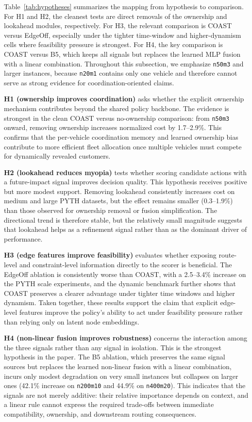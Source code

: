 \documentclass[letterpaper]{article}
\begin{document}
Table~\ref{tab:hypotheses} summarizes the mapping from hypothesis to comparison. For H1 and H2, the cleanest tests are direct removals of the ownership and lookahead modules, respectively. For H3, the relevant comparison is COAST versus EdgeOff, especially under the tighter time-window and higher-dynamism cells where feasibility pressure is strongest. For H4, the key comparison is COAST versus B5, which keeps all signals but replaces the learned MLP fusion with a linear combination. Throughout this subsection, we emphasize \texttt{n50m3} and larger instances, because \texttt{n20m1} contains only one vehicle and therefore cannot serve as strong evidence for coordination-oriented claims.

\textbf{H1 (ownership improves coordination)} asks whether the explicit ownership mechanism contributes beyond the shared policy backbone. The evidence is strongest in the clean COAST versus no-ownership comparison: from \texttt{n50m3} onward, removing ownership increases normalized cost by 1.7--2.9\%. This confirms that the per-vehicle coordination memory and learned ownership bias contribute to more efficient fleet allocation once multiple vehicles must compete for dynamically revealed customers.

\textbf{H2 (lookahead reduces myopia)} tests whether scoring candidate actions with a future-impact signal improves decision quality. This hypothesis receives positive but more modest support. Removing lookahead consistently increases cost on medium and large PYTH datasets, but the effect remains smaller (0.3--1.9\%) than those observed for ownership removal or fusion simplification. The directional trend is therefore stable, but the relatively small magnitude suggests that lookahead helps as a refinement signal rather than as the dominant driver of performance.

\textbf{H3 (edge features improve feasibility)} evaluates whether exposing route-level and constraint-level information directly to the scorer is beneficial. The EdgeOff ablation is consistently worse than COAST, with a 2.5--3.4\% increase on the PYTH scale experiments, and the dynamic benchmark further shows that COAST preserves a clearer advantage under tighter time windows and higher dynamism. Taken together, these results support the claim that explicit edge-level features improve the policy's ability to act under feasibility pressure rather than relying only on latent node embeddings.

\textbf{H4 (non-linear fusion improves robustness)} concerns the interaction among the three signals rather than any signal in isolation. This is the strongest hypothesis in the paper. The B5 ablation, which preserves the same signal sources but replaces the learned non-linear fusion with a linear combination, incurs only modest degradation on very small instances but collapses on larger ones (42.1\% increase on \texttt{n200m10} and 44.9\% on \texttt{n400m20}). This indicates that the signals are not merely additive: their relative importance depends on context, and a linear rule cannot express the required trade-offs between immediate compatibility, ownership, and downstream routing consequences.
\end{document}
